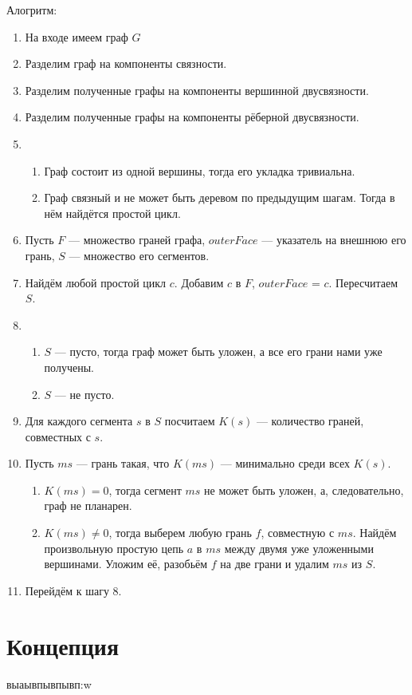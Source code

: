 \documentclass[a4paper, 10pt]{article}
\begin{document}
Алогритм:
\begin{enumerate}
    \item На входе имеем граф $G$
    \item Разделим граф на компоненты связности.
    \item Разделим полученные графы на компоненты вершинной двусвязности.
    \item Разделим полученные графы на компоненты рёберной двусвязности. 
    \item 
          \begin{enumerate}
          \item Граф состоит из одной вершины, тогда его укладка тривиальна.
          \item Граф связный и не может быть деревом по предыдущим шагам.
                Тогда в нём найдётся простой цикл.
          \end{enumerate}
    \item Пусть $F$ — множество граней графа, $outerFace$ — указатель на внешнюю его грань, $S$ — множество его сегментов.
    \item Найдём любой простой цикл $c$. Добавим $c$ в $F$, $outerFace$ = $c$. Пересчитаем $S$.
    \item
          \begin{enumerate}
          \item $S$ — пусто, тогда граф может быть уложен, а все его грани нами уже получены.
          \item $S$ — не пусто.
          \end{enumerate}
    \item Для каждого сегмента $s$ в $S$ посчитаем $K(s)$ — количество граней, совместных с $s$.
    \item Пусть $ms$ — грань такая, что $K(ms)$ — минимально среди всех $K(s)$.
          \begin{enumerate}
          \item $K(ms) = 0$, тогда сегмент $ms$ не может быть уложен, а, следовательно, граф не планарен.
          \item $K(ms) \ne 0$, тогда выберем любую грань $f$, совместную с $ms$. Найдём произвольную простую цепь $a$ в $ms$ между двумя уже уложенными вершинами. Уложим её, разобьём $f$ на две грани и удалим $ms$ из $S$.
          \end{enumerate}
    \item Перейдём к шагу 8.
        
    
\end{enumerate}

\section{Концепция}
выаывпывпывп:w
\end{document}
